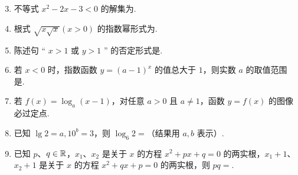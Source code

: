 

\begin{enumerate}
\setcounter{enumi}{2}

\item 不等式 $x^2-2x-3<0$ 的解集为\blankline[4.4em].

\ifanswer
\solbegin
{}
\solend
\fi

\item 根式 $\sqrt{x\sqrt{x}}(x>0)$ 的指数幂形式为\blankline[4.4em].

\ifanswer
\solbegin
{}
\solend
\fi

\item 陈述句 “ $x>1$ 或 $y>1$ ” 的否定形式是\blankline[4.4em].

\ifanswer
{}
\fi

\item 若 $x<0$ 时，指数函数 $y=(a-1)^x$ 的值总大于 $1$，则实数 $a$ 的取值范围是\blankline[4.4em].

\ifanswer
\solbegin
{}
\solend
\fi

\item 若 $f(x)=\log_a(x-1)$，对任意 $a>0$ 且 $a\neq1$，函数 $y=f(x)$ 的图像必过定点\blankline[4.4em].

\ifanswer
\solbegin
{}
\solend
\fi

\item 已知 $\lg 2=a,10^b=3$，则 $\log_6 2=$\blankline[4.4em]（结果用 $a,b$ 表示）.

\ifanswer
\solbegin
{}
\solend
\fi

\item 已知 $p$、$q\in\mathbb{R}$，$x_1$、$x_2$ 是关于 $x$ 的方程 $x^2+px+q=0$ 的两实根，$x_1+1$、$x_2+1$ 是关于 $x$ 的方程 $x^2+qx+p=0$ 的两实根，则 $pq=$\blankline[4.4em].


\end{enumerate}
